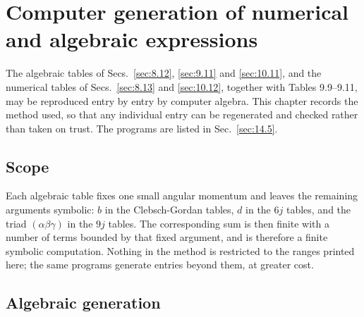 \chapter{Computer generation of numerical and algebraic expressions}\label{chap:14}

The algebraic tables of Secs.~\ref{sec:8.12}, \ref{sec:9.11} and \ref{sec:10.11},
and the numerical tables of Secs.~\ref{sec:8.13} and \ref{sec:10.12}, together
with Tables 9.9--9.11, may be reproduced entry by entry by computer algebra. This
chapter records the method used, so that any individual entry can be
regenerated and checked rather than taken on trust. The programs are listed in
Sec.~\ref{sec:14.5}.

\section{Scope}\label{sec:14.1}
Each algebraic table fixes one small angular momentum and leaves the remaining
arguments symbolic: $b$ in the Clebsch-Gordan tables, $d$ in the $6j$ tables,
and the triad $(\alpha \beta \gamma)$ in the $9j$ tables. The corresponding sum
is then finite with a number of terms bounded by that fixed argument, and is
therefore a finite symbolic computation. Nothing in the method is restricted to
the ranges printed here; the same programs generate entries beyond them, at
greater cost.

\section{Algebraic generation}\label{sec:14.2}

